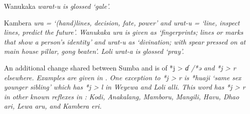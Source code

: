 \begin{table}
\begin{threeparttable}
		\begin{tablenotes}\tnsize
			\item[†]	{Wanukaka \it{warat-u} is glossed ‘gale’.}
			\item[‡]	{Kambera \it{ura} = ‘(hand)lines,
								decision, fate, power’
								and \it{urat-u} = ‘line, inspect lines, predict the future’.
								Wanukaka \it{ura} is given as ‘fingerprints; lines or marks that
								show a person’s identity’
								and \it{urat-u} as ‘divination; with spear pressed on at main
								house pillar, gong beaten’.
								Loli \it{urat-a} is glossed ‘pray’.}
		\end{tablenotes}
	\end{threeparttable}
\end{table}

\clearpage
An additional change shared between Sumba
and  is of *j > \it{ɗ} /*ə{\gap}
and *j > \it{r} elsewhere.
Examples are given in .
One exception to *j > \it{r} is *huaji ‘same sex younger sibling’
which has *j > \it{l} in Weyewa and Loli \it{alli}.
This word has *j > \it{r} in other known reflexes in :
Kodi, Anakalang, Mamboru, Mangili, Havu,
Dhao \it{ari}, Lewa \it{aru},
and Kambera \it{eri}.

